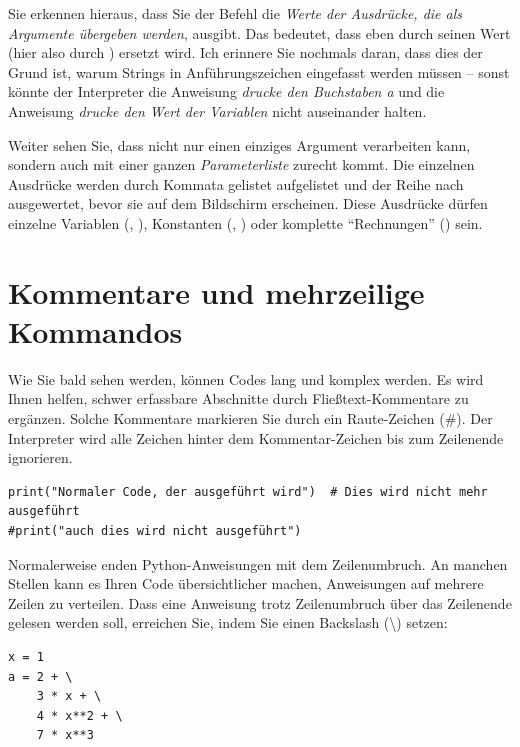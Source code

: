 Sie erkennen hieraus, dass Sie der Befehl  die \emph{Werte der Ausdrücke, die als Argumente übergeben werden}, ausgibt. Das bedeutet, dass  eben durch seinen Wert (hier also durch ) ersetzt wird. Ich erinnere Sie nochmals daran, dass dies der Grund ist, warum Strings in Anführungszeichen eingefasst werden müssen -- sonst könnte der Interpreter die Anweisung \emph{drucke den Buchstaben a} und die Anweisung \emph{drucke den Wert der Variablen } nicht auseinander halten.

Weiter sehen Sie, dass  nicht nur einen einziges Argument verarbeiten kann, sondern auch mit einer ganzen \emph{Parameterliste} zurecht kommt. Die einzelnen Ausdrücke werden durch Kommata gelistet aufgelistet und der Reihe nach ausgewertet, bevor sie auf dem Bildschirm erscheinen. Diese Ausdrücke dürfen einzelne Variablen (, ), Konstanten (, ) oder komplette \enquote{Rechnungen} () sein.



\section{Kommentare und mehrzeilige Kommandos}
Wie Sie bald sehen werden, können Codes lang und komplex werden. Es wird Ihnen helfen, schwer erfassbare Abschnitte durch Fließtext-Kommentare zu ergänzen. Solche Kommentare markieren Sie durch ein Raute-Zeichen (\#). Der Interpreter wird alle Zeichen hinter dem Kommentar-Zeichen bis zum Zeilenende ignorieren.

\begin{codebox}
\begin{verbatim}
print("Normaler Code, der ausgeführt wird")  # Dies wird nicht mehr ausgeführt
#print("auch dies wird nicht ausgeführt")
\end{verbatim}
\end{codebox}

Normalerweise enden Python-Anweisungen mit dem Zeilenumbruch. An manchen Stellen kann es Ihren Code übersichtlicher machen, Anweisungen auf mehrere Zeilen zu verteilen. Dass eine Anweisung trotz Zeilenumbruch über das Zeilenende gelesen werden soll, erreichen Sie, indem Sie einen Backslash (\textbackslash) setzen:

\begin{codebox}
\begin{verbatim}
x = 1
a = 2 + \
    3 * x + \
    4 * x**2 + \
    7 * x**3
\end{verbatim}
\end{codebox}



